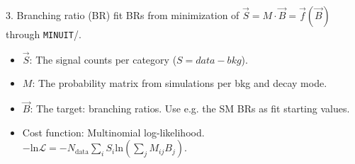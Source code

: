 \begin{block}{3. Branching ratio (BR) fit}
    BRs from minimization of $\vec{S} = M \cdot \vec{B} = \vec{f}(\vec{B})$ through
    \texttt{MINUIT}/{\href{https://github.com/scikit-hep/iminuit}{}}.
    \begin{itemize}
        \item $\vec{S}$: The signal counts per category ($S = data - bkg$).
        \item $M$: The probability matrix from simulations per bkg and decay mode.
        \item $\vec{B}$: The target: branching ratios.
              Use e.g. the SM BRs as fit starting values.
        \item Cost function: Multinomial log-likelihood.
            $- \mathrm{ln}\mathcal{L}
            = - N_{\mathrm{data}} \sum_i S_i \mathrm{ln}
            \left(\sum_j M_{ij}B_j\right)$.
    \end{itemize}
\end{block}
